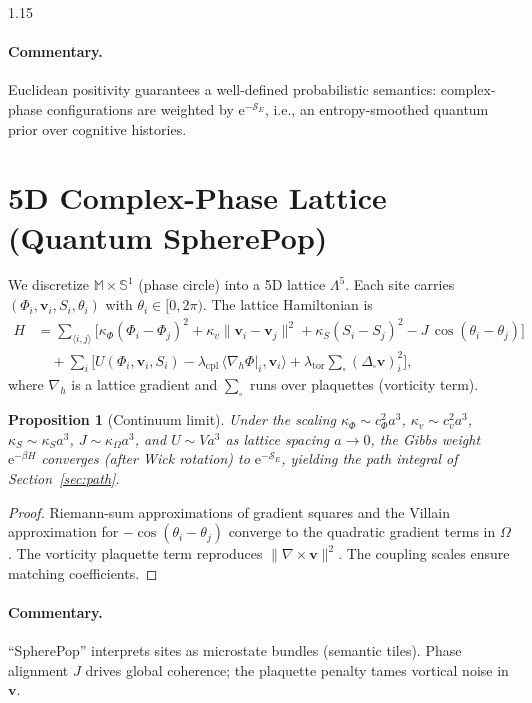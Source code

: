 \documentclass[12pt,a4paper]{article}
\numberwithin{equation}{section}
\theoremstyle{definition}
\theoremstyle{plain}
\newtheorem{proposition}{Proposition}[section]
\theoremstyle{remark}
\newcommand{\M}{\mathbb{M}}
\newcommand{\bbS}{\mathbb{S}}
\newcommand{\e}{\mathrm{e}}
\begin{document}
\begin{spacing}{1.15}
\paragraph{Commentary.}
Euclidean positivity guarantees a well-defined probabilistic semantics: complex-phase configurations are weighted by $\e^{-\mathcal{S}_E}$, i.e., an entropy-smoothed quantum prior over cognitive histories.

\section{5D Complex-Phase Lattice (Quantum SpherePop)}\label{sec:lattice}
We discretize $\M\times \bbS^1$ (phase circle) into a 5D lattice $\Lambda^5$. Each site carries $(\Phi_i,\mathbf{v}_i,S_i,\theta_i)$ with $\theta_i\in[0,2\pi)$. The lattice Hamiltonian is
\begin{align}
H &= \sum_{\langle i,j\rangle}\Big[ 
\kappa_\Phi(\Phi_i-\Phi_j)^2
+ \kappa_v \|\mathbf{v}_i-\mathbf{v}_j\|^2
+ \kappa_S (S_i-S_j)^2
- J\,\cos(\theta_i-\theta_j)
\Big] \nonumber\\
&\quad + \sum_i \Big[
U(\Phi_i,\mathbf{v}_i,S_i) - \lambda_\mathrm{cpl}\,\langle \nabla_h \Phi\rvert_i,\mathbf{v}_i\rangle
+ \lambda_\mathrm{tor} \sum_{\square} (\Delta_\square \mathbf{v})_i^2
\Big],
\end{align}
where $\nabla_h$ is a lattice gradient and $\sum_{\square}$ runs over plaquettes (vorticity term).

\begin{proposition}[Continuum limit]\label{prop:continuum}
Under the scaling $\kappa_\Phi\sim c_\Phi^2 a^3$, $\kappa_v\sim c_v^2 a^3$, $\kappa_S\sim \kappa_S a^3$, $J\sim \kappa_\Omega a^3$, and $U\sim V a^3$ as lattice spacing $a\to 0$, the Gibbs weight $\e^{-\beta H}$ converges (after Wick rotation) to $\e^{-\mathcal{S}_E}$, yielding the path integral of Section~\ref{sec:path}.
\end{proposition}
\begin{proof}
Riemann-sum approximations of gradient squares and the Villain approximation for $-\cos(\theta_i-\theta_j)$ converge to the quadratic gradient terms in $\Omega$. The vorticity plaquette term reproduces $\|\nabla\times\mathbf{v}\|^2$. The coupling scales ensure matching coefficients.
\end{proof}

\paragraph{Commentary.}
``SpherePop'' interprets sites as microstate bundles (semantic tiles). Phase alignment $J$ drives global coherence; the plaquette penalty tames vortical noise in $\mathbf{v}$.


\end{spacing}
\end{document}
